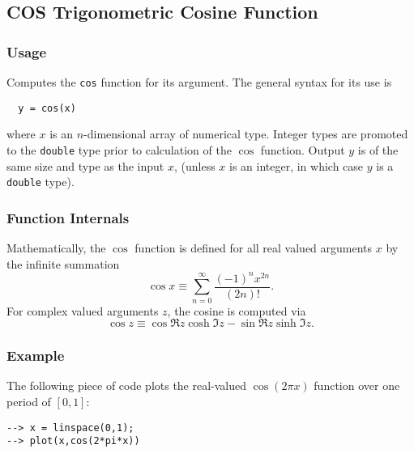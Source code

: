 %
%
%
\subsection{COS Trigonometric Cosine Function}
\subsubsection{Usage}
Computes the \verb|cos| function for its argument.  The general
syntax for its use is
\begin{verbatim}
  y = cos(x)
\end{verbatim}
where $x$ is an $n$-dimensional array of numerical type.
Integer types are promoted to the \verb|double| type prior to
calculation of the $\cos$ function.  Output $y$ is of the
same size and type as the input $x$, (unless $x$ is an
integer, in which case $y$ is a \verb|double| type).  
\subsubsection{Function Internals}
Mathematically, the $\cos$ function is defined for all real
valued arguments $x$ by the infinite summation
\[
  \cos x \equiv \sum_{n=0}^{\infty} \frac{(-1)^n x^{2n}}{(2n)!}.
\]
For complex valued arguments $z$, the cosine is computed via
\[
  \cos z \equiv \cos \Re z \cosh \Im z - \sin \Re z
  \sinh \Im z.
\]
\subsubsection{Example}
The following piece of code plots the real-valued $\cos(2\pi x)$
function over one period of $[0,1]$:
\begin{verbatim}
--> x = linspace(0,1);
--> plot(x,cos(2*pi*x))
\end{verbatim}
